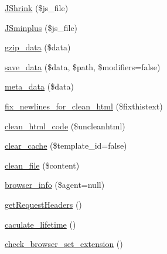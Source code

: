 \begin{DoxyCompactItemize}
\hyperlink{class_t_i_d_engine_ab97cdbd51067978f155d7611010b4e7f}{JShrink} (\$js\_\-file)
\item 
\hyperlink{class_t_i_d_engine_a37b0692940dabb81cb4b317721fe1657}{JSminplus} (\$js\_\-file)
\item 
\hyperlink{class_t_i_d_engine_aa51877c4a67aee5e44b3291aa3aa4de2}{gzip\_\-data} (\$data)
\item 
\hyperlink{class_t_i_d_engine_adaa8cd255f4af21f4fa6d1566a90e8b7}{save\_\-data} (\$data, \$path, \$modifiers=false)
\item 
\hyperlink{class_t_i_d_engine_a4d6587cd9ae73fa86b13f90c7ddf5a2d}{meta\_\-data} (\$data)
\item 
\hyperlink{class_t_i_d_engine_ab0432c08e048640c83f871e3ca119e62}{fix\_\-newlines\_\-for\_\-clean\_\-html} (\$fixthistext)
\item 
\hyperlink{class_t_i_d_engine_a5c7a49fd6510389df88ca9f97685b2af}{clean\_\-html\_\-code} (\$uncleanhtml)
\item 
\hyperlink{class_t_i_d_engine_a05cc9b8d0b0f75a57a2b3da3a8891780}{clear\_\-cache} (\$template\_\-id=false)
\item 
\hyperlink{class_t_i_d_engine_a85b507378fa82cfbbcde72783fe506b8}{clean\_\-file} (\$content)
\item 
\hyperlink{class_t_i_d_engine_acac77e9d1c1ea28406556e5dd88f1dc1}{browser\_\-info} (\$agent=null)
\item 
\hyperlink{class_t_i_d_engine_a6f31e46a51e73bd13b22a605d6599edf}{getRequestHeaders} ()
\item 
\hyperlink{class_t_i_d_engine_a406da7d26abff8587a707e5e7315bacf}{caculate\_\-lifetime} ()
\item 
\hyperlink{class_t_i_d_engine_a16783567e39b102990730f699675819c}{check\_\-browser\_\-set\_\-extension} ()
\end{DoxyCompactItemize}
